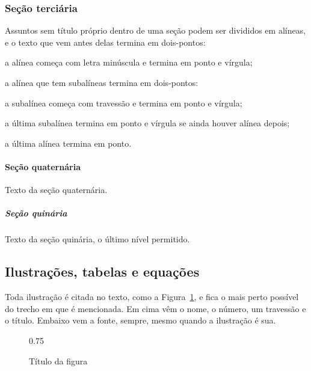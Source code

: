 \documentclass[12pt,a4paper,oneside]{article}
\begin{document}
\subsubsection{Seção terciária}

Assuntos sem título próprio dentro de uma seção podem ser divididos em alíneas, e o texto que vem antes delas termina em dois-pontos:
\begin{alineas}
  \item a alínea começa com letra minúscula e termina em ponto e vírgula;
  \item a alínea que tem subalíneas termina em dois-pontos:
  \begin{subalineas}
    \item a subalínea começa com travessão e termina em ponto e vírgula;
    \item a última subalínea termina em ponto e vírgula se ainda houver alínea depois;
  \end{subalineas}
  \item a última alínea termina em ponto.
\end{alineas}

\paragraph{Seção quaternária}

Texto da seção quaternária.

\subparagraph{Seção quinária}

Texto da seção quinária, o último nível permitido.

\subsection{Ilustrações, tabelas e equações}

Toda ilustração é citada no texto, como a Figura~\ref{fig:exemplo}, e fica o mais perto possível do trecho em que é mencionada. Em cima vêm o nome, o número, um travessão e o título. Embaixo vem a fonte, sempre, mesmo quando a ilustração é sua.

\begin{figure}[htbp]
  \begin{ilustracao}{0.75\textwidth}
    \caption{Título da figura}\label{fig:exemplo}
  \end{ilustracao}
\end{figure}
\end{document}
